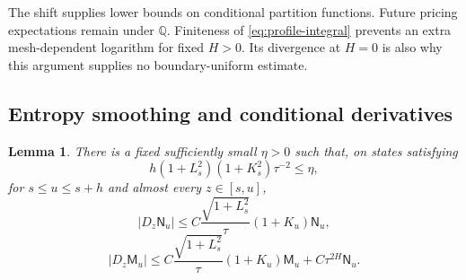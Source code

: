 \documentclass[11pt,a4paper]{amsart}
\theoremstyle{plain}
\newtheorem{lemma}[theorem]{Lemma}
\theoremstyle{definition}
\theoremstyle{remark}
\newcommand{\QQ}{\mathbb{Q}}
\begin{document}
The shift supplies lower bounds on conditional partition functions. Future pricing expectations remain under $\QQ$. Finiteness of \eqref{eq:profile-integral} prevents an extra mesh-dependent logarithm for fixed $H>0$. Its divergence at $H=0$ is also why this argument supplies no boundary-uniform estimate.

\subsection{Entropy smoothing and conditional derivatives}
\begin{lemma}\label{lem:rough-derivative}
There is a fixed sufficiently small $\eta>0$ such that, on states satisfying
\begin{equation}\label{eq:rough-eligibility}
 h(1+L_s^2)(1+K_s^2)\tau^{-2}\le\eta,
\end{equation}
for $s\le u\le s+h$ and almost every $z\in[s,u]$,
\begin{equation}\label{eq:rough-N-derivative}
 |D_z\mathsf N_u|\le
 C\frac{\sqrt{1+L_s^2}}{\tau}(1+K_u)\mathsf N_u,
\end{equation}
\begin{equation}\label{eq:rough-M-derivative}
 |D_z\mathsf M_u|\le
 C\frac{\sqrt{1+L_s^2}}{\tau}(1+K_u)\mathsf M_u
                     +C\tau^{2H}\mathsf N_u.
\end{equation}
\end{lemma}
\end{document}
